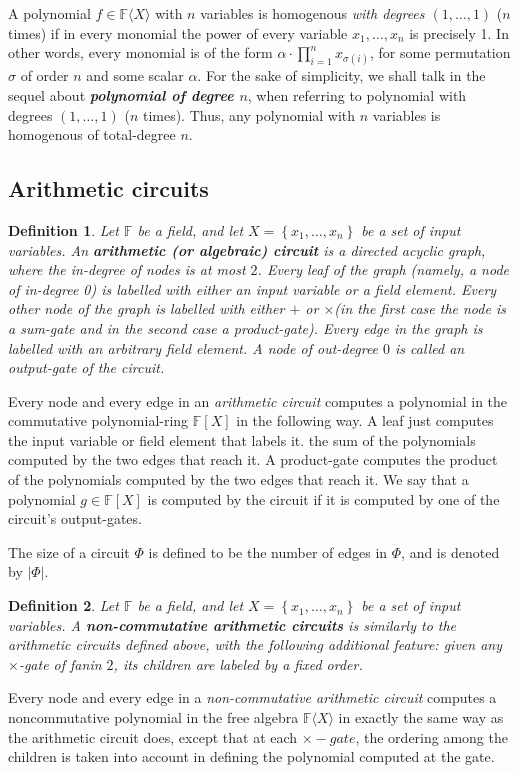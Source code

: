 \documentclass[12pt,reqno]{article}
\newtheorem{definition}{Definition}
\newcommand\F{\ensuremath{\mathbb F}}
\newcommand{\cd}{\cdot}
\newcommand{\freea}{\ensuremath{\F\langle X\rangle}}
\newcommand{\set}[1]{\left\{#1\right\}}
\newcommand{\nx}[1]{#1_1,\ldots,#1_{n}}
\begin{document}
A polynomial $f\in \freea$ with $n$ variables is homogenous  \emph{with degrees $(1,\ldots,1)$}  ($n$ times) if in every monomial the power of every variable $x_1,\ldots,x_n$ is precisely 1. In other words, every monomial is of the form $\alpha\cd \prod _{i=1}^n x_{\sigma(i)}$, for some permutation $\sigma$ of order $n$ and some scalar $\alpha$. For the sake of simplicity, we shall talk in the sequel about \textit{\textbf{ polynomial of degree $n$}}, when referring to  polynomial with degrees $(1,\ldots,1)$ ($n$ times). Thus, any  polynomial with $n$ variables is homogenous of total-degree  $n$.



\subsection{Arithmetic circuits}\label{sec:app_arithmetic_circuit}

\begin{definition}
Let $\F$ be a field, and let $X=\set{\nx{x}}$ be a set of input variables. An \textbf{arithmetic (or algebraic) circuit} is a directed acyclic graph, where the in-degree of nodes is at most $2$. Every leaf of the graph (namely, a node of in-degree 0) is labelled with either an input variable or a field element. Every other node of the graph is labelled with either $+$ or $\times$(in the first case the node is a sum-gate and in the second case a product-gate). Every edge in the graph is labelled with an arbitrary field element. A node of out-degree $0$ is called an output-gate of the circuit.
\end{definition}

Every node and every edge in an \emph{arithmetic circuit} computes a polynomial in the commutative polynomial-ring $\F[X]$ in the following way. A leaf just computes the input variable or field element that labels it. %
the sum of the polynomials computed by the two edges that reach it. A product-gate computes the product
of the polynomials computed by the two edges that reach it. We say that a polynomial $g \in \F[X]$ is computed by the circuit if it is computed by one of the circuit's output-gates.

The size of a circuit $\Phi$ is defined to be the number of edges in $\Phi$, and is denoted by $|\Phi|$.

\begin{definition}
Let $\F$ be a field, and let $X=\set{\nx{x}}$ be a set of input variables. A \textbf{non-commutative arithmetic circuits} is
similarly to the arithmetic circuits defined above, with the following additional feature: given any $\times$-gate of fanin $2$, its children are labeled by a fixed order.
\end{definition}
Every node and every edge in a \emph{non-commutative arithmetic circuit} computes a noncommutative polynomial in the free algebra $\freea$ in exactly the same way as the arithmetic circuit does, except that at each $\times-gate$, the ordering among the children is taken into account in defining the polynomial computed at the gate.
\end{document}

